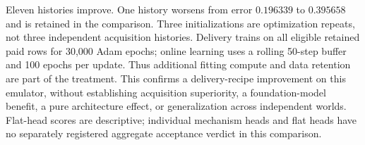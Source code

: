 \documentclass[twoside]{article}
\theoremstyle{plain}
\theoremstyle{definition}
\theoremstyle{remark}
\begin{document}
Eleven histories improve. One history worsens from error $0.196339$ to
$0.395658$ and is retained in the comparison. Three initializations are
optimization repeats, not three independent acquisition histories.
Delivery trains on all eligible retained paid rows for 30,000 Adam epochs;
online learning uses a rolling 50-step buffer and 100 epochs per update.
Thus additional fitting compute and data retention are part of the treatment.
This confirms a delivery-recipe improvement on this emulator, without
establishing acquisition superiority, a foundation-model benefit, a pure
architecture effect, or generalization across independent worlds. Flat-head
scores are descriptive; individual mechanism heads and flat heads have no
separately registered aggregate acceptance verdict in this comparison.
\end{document}
